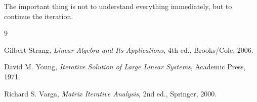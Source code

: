 \documentclass[11pt,a4paper]{article}
\theoremstyle{definition}
\theoremstyle{remark}
\begin{document}
The important thing is not to understand
everything immediately, but to continue
the iteration.


\begin{thebibliography}{9}

Gilbert Strang,
\textit{Linear Algebra and Its Applications},
4th ed.,
Brooks/Cole, 2006.

David M. Young,
\textit{Iterative Solution of Large Linear Systems},
Academic Press, 1971.

Richard S. Varga,
\textit{Matrix Iterative Analysis},
2nd ed.,
Springer, 2000.

\end{thebibliography}
\end{document}
